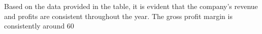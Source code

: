 

Based on the data provided in the table, it is evident that the company's revenue and profits are consistent throughout the year. The gross profit margin is consistently around 60%